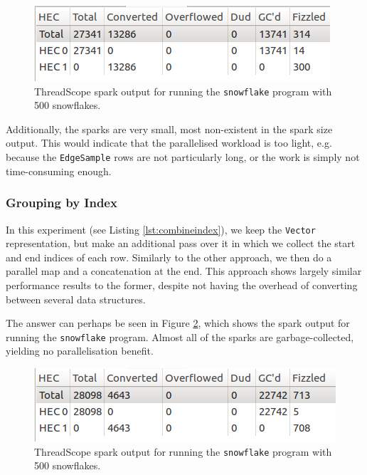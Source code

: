 \documentclass[12pt, a4paper]{article}
\begin{document}
 \begin{figure}[H]
  \centering
  \includegraphics[scale=1]{../threadscope/combinegrouped/sparks}
  \caption{ThreadScope spark output for running the \texttt{snowflake} program with 500 snowflakes.}
  \label{fig:combinegrouped-sparks}
\end{figure}

Additionally, the sparks are very small, most non-existent in the spark size output. This would indicate that the parallelised workload is too light, e.g. because the \texttt{EdgeSample} rows are not particularly long, or the work is simply not time-consuming enough.

\subsubsection{Grouping by Index}\label{sec:combine-vindex}

In this experiment (see Listing \ref{lst:combineindex}), we keep the \texttt{Vector} representation, but make an additional pass over it in which we collect the start and end indices of each row. Similarly to the other approach, we then do a parallel map and a concatenation at the end. This approach shows largely similar performance results to the former, despite not having the overhead of converting between several data structures.

The answer can perhaps be seen in Figure \ref{fig:combineindex-sparks}, which shows the spark output for running the \texttt{snowflake} program. Almost all of the sparks are garbage-collected, yielding no parallelisation benefit.

 \begin{figure}[h!]
  \centering
  \includegraphics[scale=1]{../threadscope/combineindex/sparks}
  \caption{ThreadScope spark output for running the \texttt{snowflake} program with 500 snowflakes.}
  \label{fig:combineindex-sparks}
\end{figure}
\end{document}
